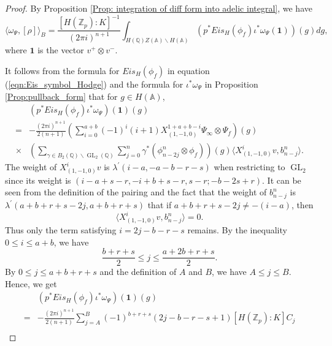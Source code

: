\documentclass[11pt, a4paper]{amsart}
\theoremstyle{plain}
\theoremstyle{definition}
\numberwithin{equation}{section}
\def\AAA{\mathbb{A}}
\def\QQ{\mathbb{Q}}
\def\ZZ{\mathbb{Z}}
\DeclareMathOperator{\GL}{\mathrm{GL}}
\newcommand{\Zp}{\ZZ_p}
\begin{document}
\begin{proof}
    By Proposition \ref{Prop: integration of diff form into adelic integral}, we have 
    \begin{equation*}
        \langle \omega_{\Psi}, [\rho] \rangle_{B} =  \frac{[H(\Zp): K]^{-1}}{(2\pi{i})^{n + 1}} \int_{H(\QQ) Z(\AAA) \backslash H(\AAA) } (p^{*} Eis_{H}(\phi_f) \iota^{*} \omega_{\Psi} (\mathbf{1}))(g) dg,  
    \end{equation*}
    where $\mathbf{1}$ is the vector $v^{+} \otimes v^{-}$.  
    \par It follows from the formula for $Eis_{H}(\phi_f)$ in equation (\ref{eqn:Eis_symbol_Hodge}) and the formula for $\iota^{*} \omega_{\Psi}$ in Proposition \ref{Prop:pullback_form} that for $g \in H(\AAA)$, 
    \begin{align*}
        & (p^{*} Eis_{H}(\phi_f) \iota^{*} \omega_{\Psi})(\mathbf{1})(g) \\
        = & -\frac{(2\pi{i})^{n + 1}}{2(n + 1)} (\sum\limits_{i = 0}^{a + b} (-1)^{i} (i + 1) X^{1 + a + b - i}_{(1, -1, 0)} \Psi_{\infty} \otimes \Psi_f) (g)\\
         \times & (\sum\limits_{\gamma \in B_{2}(\QQ) \backslash \GL_2(\QQ)} \sum\limits_{j = 0}^{n} \gamma^{*} (\phi_{n - 2j}^{n} \otimes \phi_f))(g) \langle X^{i}_{(1, -1, 0)}v, b^{n}_{n-j} \rangle.
    \end{align*}
    The weight of $X^{i}_{(1, -1, 0)}v$ is $\lambda^{\prime}(i - a, -a -b -r -s)$ when restricting to $\GL_{2}$ since its weight  is $(i - a + s - r, -i + b + s - r, s - r; -b - 2s + r)$. It can be seen from the definition of the pairing and the fact that the weight of $b^{n}_{n - j}$ is $\lambda^{\prime}(a + b + r + s - 2j, a + b + r + s)$ 
    that if $a + b + r + s - 2j \neq -(i - a)$, then 
    \begin{equation*}
        \langle X^{i}_{(1, -1, 0)}v, b^{n}_{n-j} \rangle = 0. 
    \end{equation*}
    Thus only the term satisfying $i = 2j - b - r - s$ remains. 
    By the inequality $0 \le i \le a + b$, we have 
    \begin{equation*}
        \frac{b + r + s}{2} \le j \le \frac{a + 2b + r + s}{2}. 
    \end{equation*}
    By $0 \le j \le a + b + r + s$ and the definition of $A$ and $B$, we have $A \le j \le B$. Hence, we get 
    \begin{align*}
        & (p^{*} Eis_{H}(\phi_f) \iota^{*} \omega_{\Psi})(\mathbf{1})(g) \\ 
        =& -\frac{(2\pi{i})^{n + 1}}{2(n + 1)} \sum\limits_{j = A}^{B} (-1)^{b + r + s}(2j -b -r -s + 1) [H(\Zp): K]C_j \\

\end{align*}
\end{proof}
\end{document}
